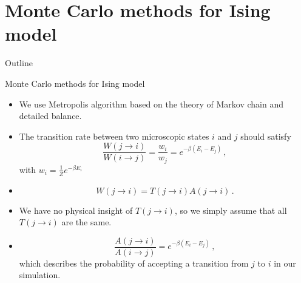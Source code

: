 \documentclass{beamer}
\begin{document}
\section{Monte Carlo methods for Ising model}
\begin{frame}{Outline}
\tableofcontents[currentsection]
\end{frame}

\begin{frame}{Monte Carlo methods for Ising model}
\begin{itemize}
	\item<1-> We use Metropolis algorithm based on the theory of Markov chain and detailed balance. 
	\item<2-> The transition rate between two microscopic states $i$ and $j$ should satisfy 
	\begin{equation}\label{eq:Wfrac}
	\frac{W(j \rightarrow i)}{W(i \rightarrow j)}=\frac{w_i}{w_j}=e^{-\beta\left(E_i-E_j\right)}\,,
	\end{equation}
	with $w_i=\frac{1}{Z}e^{-\beta E_i}$ 
	\item<3-> 
	\begin{equation}
	W(j \rightarrow i)=T(j \rightarrow i)A(j \rightarrow i)\,.
	\end{equation}
	\item<4-> We have no physical insight of $T(j \rightarrow i)$, 
	so we simply assume that all $T(j \rightarrow i)$ are the same. 
	\item<5-> 
	\begin{equation}\label{eq:Afrac}
	\frac{A(j \rightarrow i)}{A(i \rightarrow j)}=e^{-\beta\left(E_i-E_j\right)}\,,
	\end{equation}
	which describes the probability of accepting a transition from $j$ to $i$ in our simulation. 
\end{itemize}
\end{frame}
\end{document}
